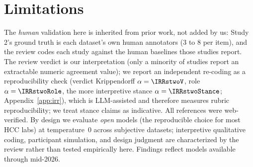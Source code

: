 \section{Limitations}
The \emph{human} validation here is inherited from prior work, not added by us: Study 2's ground truth is each
dataset's own human annotators (3 to 8 per item), and the review codes each study against the human baselines those
studies report. The review verdict is our interpretation (only a minority of studies report an extractable numeric
agreement value); we report an independent re-coding as a reproducibility check (verdict Krippendorff
$\alpha=\IRRstwoV$, role $\alpha=\IRRstwoRole$, the more interpretive stance $\alpha=\IRRstwoStance$;
Appendix~\ref{app:irr}), which is LLM-assisted and therefore measures rubric reproducibility; we treat stance claims
as indicative. All references were web-verified. By design we evaluate \emph{open} models (the reproducible choice
for most HCC labs) at temperature~0 across \SOCndat{} subjective datasets; interpretive qualitative coding,
participant simulation, and design judgment are characterized by the review rather than tested empirically here.
Findings reflect models available through mid-2026.
